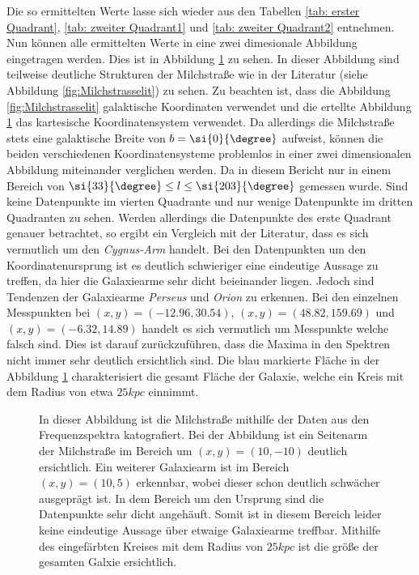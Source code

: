 Die so ermittelten Werte lasse sich wieder aus den Tabellen \ref{tab: erster Quadrant}, \ref{tab: zweiter Quadrant1} und \ref{tab: zweiter Quadrant2} entnehmen.\newline
Nun können alle ermittelten Werte in eine zwei dimesionale Abbildung eingetragen werden. Dies ist in Abbildung \ref{fig:Milchstrassesafe} zu sehen. In dieser Abbildung sind teilweise deutliche Strukturen der Milchstraße wie in der Literatur (siehe Abbildung \ref{fig:Milchstrasselit}) zu sehen. Zu beachten ist, dass die Abbildung \ref{fig:Milchstrasselit} galaktische Koordinaten verwendet und die ertellte Abbildung \ref{fig:Milchstrassesafe} das kartesische Koordinatensystem verwendet. Da allerdings die Milchstraße stets eine galaktische Breite von $b= \si{0}{\degree}$ aufweist, können die beiden verschiedenen Koordinatensysteme problemlos in einer zwei dimensionalen Abbildung miteinander verglichen werden.\newline
Da in diesem Bericht nur in einem Bereich von $\si{33}{\degree} \le l \le \si{203}{\degree}$ gemessen wurde. Sind keine Datenpunkte im vierten Quadrante und nur wenige Datenpunkte im dritten Quadranten zu sehen. Werden allerdings die Datenpunkte des erste Quadrant genauer betrachtet, so ergibt ein Vergleich mit der Literatur, dass es sich vermutlich um den \textit{Cygnus-Arm} handelt. Bei den Datenpunkten um den Koordinatenursprung ist es deutlich schwieriger eine eindeutige Aussage zu treffen, da hier die Galaxiearme sehr dicht beieinander liegen. Jedoch sind Tendenzen der Galaxiearme \textit{Perseus} und \textit{Orion} zu erkennen. Bei den einzelnen Messpunkten bei $(x,y)=(-12.96, 30.54)$, $(x,y)=(48.82, 159.69)$ und $(x,y)=(-6.32, 14.89)$ handelt es sich vermutlich um Messpunkte welche falsch sind. Dies ist darauf zurückzuführen, dass die Maxima in den Spektren nicht immer sehr deutlich ersichtlich sind. Die blau markierte Fläche in der Abbildung \ref{fig:Milchstrassesafe} charakterisiert die gesamt Fläche der Galaxie, welche ein Kreis mit dem Radius von etwa $\si{25}{kpc}$ einnimmt.
\begin{figure}[H]
    \centering
       
    \caption[Abbildung der Milchstraße]{In dieser Abbildung ist die Milchstraße mithilfe der Daten aus den Frequenzspektra katografiert. Bei der Abbildung ist ein Seitenarm der Milchstraße im Bereich um $(x,y)=(10,-10)$ deutlich ersichtlich. Ein weiterer Galaxiearm ist im Bereich $(x,y)=(10,5)$ erkennbar, wobei dieser schon deutlich schwächer ausgeprägt ist. In dem Bereich um den Ursprung sind die Datenpunkte sehr dicht angehäuft. Somit ist in diesem Bereich leider keine eindeutige Aussage über etwaige Galaxiearme treffbar. Mithilfe des eingefärbten Kreises mit dem Radius von $\si{25}{kpc}$ ist die größe der gesamten Galxie ersichtlich.}
    \label{fig:Milchstrassesafe}
\end{figure}
